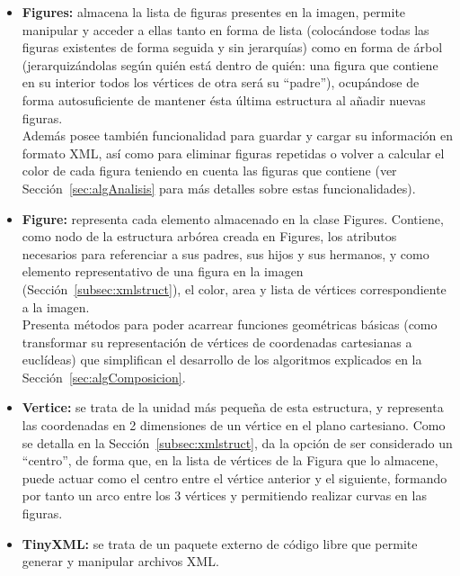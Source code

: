 	\begin{itemize}
	
		\item \textbf{Figures:} almacena la lista de figuras presentes en la imagen, permite manipular y acceder a ellas tanto en forma de lista (colocándose todas las figuras existentes de forma seguida y sin jerarquías) como en forma de árbol (jerarquizándolas según quién está dentro de quién: una figura que contiene en su interior todos los vértices de otra será su ``padre''), ocupándose de forma autosuficiente de mantener ésta última estructura al añadir nuevas figuras.\\

		Además posee también funcionalidad para guardar y cargar su información en formato XML, así como para eliminar figuras repetidas o volver a calcular el color de cada figura teniendo en cuenta las figuras que contiene (ver Sección~\ref{sec:algAnalisis} para más detalles sobre estas funcionalidades).
		
		\item \textbf{Figure:} representa cada elemento almacenado en la clase Figures. Contiene, como nodo de la estructura arbórea creada en Figures, los atributos necesarios para referenciar a sus padres, sus hijos y sus hermanos, y como elemento representativo de una figura en la imagen (Sección~\ref{subsec:xmlstruct}), el color, area y lista de vértices correspondiente a la imagen.\\
		
		Presenta métodos para poder acarrear funciones geométricas básicas (como transformar su representación de vértices de coordenadas cartesianas a euclídeas) que simplifican el desarrollo de los algoritmos explicados en la Sección~\ref{sec:algComposicion}.
		
		\item \textbf{Vertice:} se trata de la unidad más pequeña de esta estructura, y representa las coordenadas en 2 dimensiones de un vértice en el plano cartesiano. Como se detalla en la Sección~\ref{subsec:xmlstruct}, da la opción de ser considerado un ``centro'', de forma que, en la lista de vértices de la Figura que lo almacene, puede actuar como el centro entre el vértice anterior y el siguiente, formando por tanto un arco entre los 3 vértices y permitiendo realizar curvas en las figuras.
		
		\item \textbf{TinyXML:} se trata de un paquete externo de código libre que permite generar y manipular archivos XML.
	
	\end{itemize}
	
